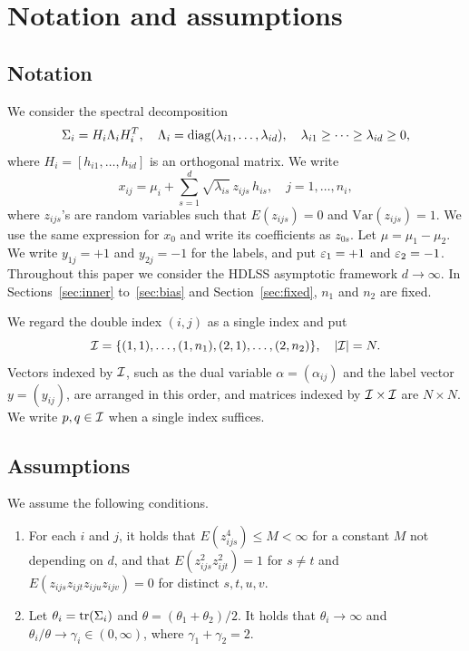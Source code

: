 \section{Notation and assumptions}
\label{sec:notation}

\subsection{Notation}

We consider the spectral decomposition
\[
\Sigma_i=H_i\Lambda_i H_i^T,\quad
\Lambda_i=\operatorname{diag}(\lambda_{i1},\dots,\lambda_{id}),\quad
\lambda_{i1}\ge\cdots\ge\lambda_{id}\ge 0,
\]
where $H_i=[h_{i1},\dots,h_{id}]$ is an orthogonal matrix. We write
\begin{equation}
x_{ij}=\mu_i+\sum_{s=1}^d\sqrt{\lambda_{is}}\,z_{ijs}\,h_{is},
\quad j=1,\dots,n_i,
\label{eq:2.1}
\end{equation}
where $z_{ijs}$'s are random variables such that $E(z_{ijs})=0$ and
$\mathrm{Var}(z_{ijs})=1$. We use the same expression for $x_0$ and write its
coefficients as $z_{0s}$. Let $\mu=\mu_1-\mu_2$. We write $y_{1j}=+1$ and
$y_{2j}=-1$ for the labels, and put $\varepsilon_1=+1$ and $\varepsilon_2=-1$. Throughout this
paper we consider the HDLSS asymptotic framework $d\to\infty$. In
Sections~\ref{sec:inner} to~\ref{sec:bias} and Section~\ref{sec:fixed}, $n_1$ and
$n_2$ are fixed.

We regard the double index $(i,j)$ as a single index and put
\begin{equation}
\mathcal{I}=\{(1,1),\dots,(1,n_1),(2,1),\dots,(2,n_2)\},
\quad|\mathcal{I}|=N.
\label{eq:2.2}
\end{equation}
Vectors indexed by $\mathcal{I}$, such as the dual variable $\alpha=(\alpha_{ij})$ and the
label vector $y=(y_{ij})$, are arranged in this order, and matrices indexed by
$\mathcal{I}\times\mathcal{I}$ are $N\times N$. We write $p,q\in\mathcal{I}$ when a single index suffices.

\subsection{Assumptions}

We assume the following conditions.

\begin{enumerate}[label=(A\arabic*),leftmargin=*]
\item For each $i$ and $j$, it holds that $E(z_{ijs}^4)\le M<\infty$ for a constant
$M$ not depending on $d$, and that $E(z_{ijs}^2 z_{ijt}^2)=1$ for $s\neq t$ and
$E(z_{ijs}z_{ijt}z_{iju}z_{ijv})=0$ for distinct $s,t,u,v$.

\item Let $\theta_i=\operatorname{tr}(\Sigma_i)$ and $\theta=(\theta_1+\theta_2)/2$. It holds that
$\theta_i\to\infty$ and $\theta_i/\theta\to\gamma_i\in(0,\infty)$, where
$\gamma_1+\gamma_2=2$.
\end{enumerate}


